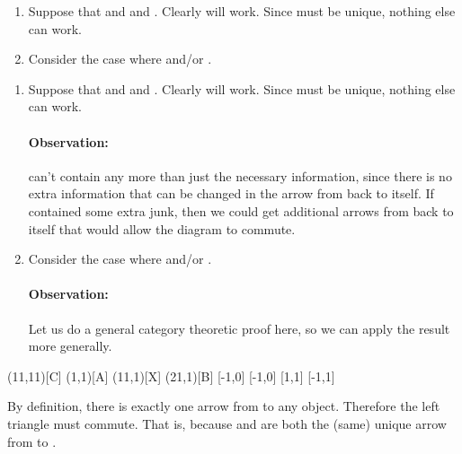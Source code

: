 \documentclass{seminar}
\begin{document}
\begin{slide}
\begin{enumerate}
\item Suppose that  and  and .
Clearly  will work.  Since \tm{[a,b]} must
be unique, nothing else can work.
\item Consider the case where  and/or .
\end{enumerate}

\newslide

\begin{enumerate}
\item Suppose that  and  and .
Clearly  will work.  Since \tm{[a,b]} must
be unique, nothing else can work.

\paragraph{Observation:}
 can't contain any more than just the necessary information,
since there is no extra information that can be changed in the arrow
from  back to itself.  If  contained some extra junk,
then we could get additional arrows from  back to itself
that would allow the diagram to commute.

\item Consider the case where  and/or .

\paragraph{Observation:}  Let us do a general category theoretic proof
here, so we can apply the result more generally.
\end{enumerate}

\newslide

\begin{cdiag}
\obj(11,11)[C]{}
\obj(1,1)[A]{}
\obj(11,1)[X]{}
\obj(21,1)[B]{}
[-1,0]
[-1,0]
[1,1]
[-1,1]
\end{cdiag}


By definition, there is exactly one arrow from  to any object.
Therefore the left triangle must commute.  That is, 
because  and  are both the (same) unique arrow
from  to .


\end{slide}
\end{document}
